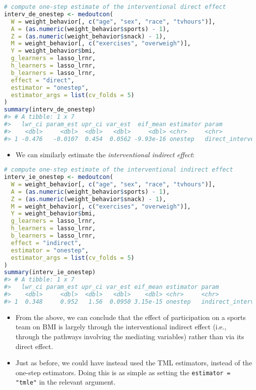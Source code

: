 \documentclass[
  12pt,
]{book}
\newcommand{\passthrough}[1]{#1}
\providecommand{\tightlist}{%
  \setlength{\itemsep}{0pt}\setlength{\parskip}{0pt}}
\theoremstyle{definition}
\theoremstyle{definition}
\theoremstyle{definition}
\newcommand{\1}{\mathbbm{1}}
\begin{document}
\begin{lstlisting}[language=R]
# compute one-step estimate of the interventional direct effect
interv_de_onestep <- medoutcon(
  W = weight_behavior[, c("age", "sex", "race", "tvhours")],
  A = (as.numeric(weight_behavior$sports) - 1),
  Z = (as.numeric(weight_behavior$snack) - 1),
  M = weight_behavior[, c("exercises", "overweigh")],
  Y = weight_behavior$bmi,
  g_learners = lasso_lrnr,
  h_learners = lasso_lrnr,
  b_learners = lasso_lrnr,
  effect = "direct",
  estimator = "onestep",
  estimator_args = list(cv_folds = 5)
)
summary(interv_de_onestep)
#> # A tibble: 1 x 7
#>   lwr_ci param_est upr_ci var_est  eif_mean estimator param                
#>    <dbl>     <dbl>  <dbl>   <dbl>     <dbl> <chr>     <chr>                
#> 1 -0.476   -0.0107  0.454  0.0562 -9.93e-16 onestep   direct_interventional
\end{lstlisting}

\begin{itemize}
\tightlist
\item
  We can similarly estimate the \emph{interventional indirect effect}:
\end{itemize}

\begin{lstlisting}[language=R]
# compute one-step estimate of the interventional indirect effect
interv_ie_onestep <- medoutcon(
  W = weight_behavior[, c("age", "sex", "race", "tvhours")],
  A = (as.numeric(weight_behavior$sports) - 1),
  Z = (as.numeric(weight_behavior$snack) - 1),
  M = weight_behavior[, c("exercises", "overweigh")],
  Y = weight_behavior$bmi,
  g_learners = lasso_lrnr,
  h_learners = lasso_lrnr,
  b_learners = lasso_lrnr,
  effect = "indirect",
  estimator = "onestep",
  estimator_args = list(cv_folds = 5)
)
summary(interv_ie_onestep)
#> # A tibble: 1 x 7
#>   lwr_ci param_est upr_ci var_est eif_mean estimator param                  
#>    <dbl>     <dbl>  <dbl>   <dbl>    <dbl> <chr>     <chr>                  
#> 1  0.348     0.952   1.56  0.0950 3.15e-15 onestep   indirect_interventional
\end{lstlisting}

\begin{itemize}
\tightlist
\item
  From the above, we can conclude that the effect of participation on a sports
  team on BMI is largely through the interventional indirect effect (i.e.,
  through the pathways involving the mediating variables) rather than via its
  direct effect.
\item
  Just as before, we could have instead used the TML estimators, instead of the
  one-step estimators. Doing this is as simple as setting the
  \passthrough{\lstinline!estimator = "tmle"!} in the relevant argument.
\end{itemize}
\end{document}
